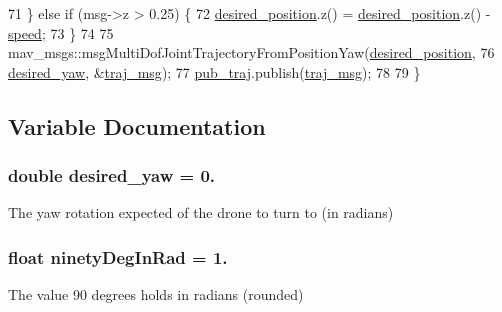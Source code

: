 \begin{DoxyCode}
71   \} \textcolor{keywordflow}{else} \textcolor{keywordflow}{if} (msg->z > 0.25) \{
72     \hyperlink{oculus-control_8cpp_a608d9948c063034b7605598daaeccc3e}{desired\_position}.z() = \hyperlink{oculus-control_8cpp_a608d9948c063034b7605598daaeccc3e}{desired\_position}.z() - 
      \hyperlink{oculus-control_8cpp_a7f7e4724cf57d59513b39c5ecc81adc8}{speed};
73   \}
74 
75   mav\_msgs::msgMultiDofJointTrajectoryFromPositionYaw(\hyperlink{oculus-control_8cpp_a608d9948c063034b7605598daaeccc3e}{desired\_position},
76       \hyperlink{oculus-control_8cpp_a03a69ef33d756512293e67791ab5f265}{desired\_yaw}, &\hyperlink{oculus-control_8cpp_a090c0766fbb77862dd8cc0cca99d688b}{traj\_msg});
77   \hyperlink{oculus-control_8cpp_a92b67ae724bc0d23b8e85e92e89403df}{pub\_traj}.publish(\hyperlink{oculus-control_8cpp_a090c0766fbb77862dd8cc0cca99d688b}{traj\_msg});
78 
79 \}
\end{DoxyCode}


\subsection{Variable Documentation}
\subsubsection[{\texorpdfstring{desired\+\_\+yaw}{desired_yaw}}]{\setlength{\rightskip}{0pt plus 5cm}double desired\+\_\+yaw = 0.}\hypertarget{oculus-control_8cpp_a03a69ef33d756512293e67791ab5f265}{}\label{oculus-control_8cpp_a03a69ef33d756512293e67791ab5f265}


The yaw rotation expected of the drone to turn to (in radians) 

\subsubsection[{\texorpdfstring{ninety\+Deg\+In\+Rad}{ninetyDegInRad}}]{\setlength{\rightskip}{0pt plus 5cm}float ninety\+Deg\+In\+Rad = 1.}\hypertarget{oculus-control_8cpp_a2cce9b626fdb3b1f78baad955bd5b609}{}\label{oculus-control_8cpp_a2cce9b626fdb3b1f78baad955bd5b609}


The value 90 degrees holds in radians (rounded) 

